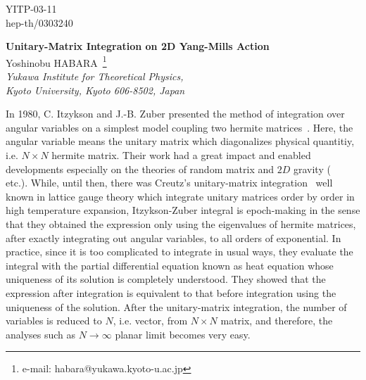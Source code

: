 \documentclass[a4paper,12pt]{article}
\begin{document}
\begin{flushright}
	YITP-03-11 \\
	hep-th/0303240
\end{flushright}

\vspace{2.5cm}

\begin{center}
{\Large\bf Unitary-Matrix Integration on 2D Yang-Mills Action}\\
\bigskip
\vspace{1.5cm}
{\large Yoshinobu H}ABARA~\footnote{e-mail: habara@yukawa.kyoto-u.ac.jp}\\
\vspace{0.5cm}
{\it  Yukawa Institute for Theoretical Physics,}\\
{\it  Kyoto University, Kyoto 606-8502, Japan}
\end{center}

\vspace{1cm}

\begin{abstract}
Using the idea of Itzykson-Zuber integral, unitary-matrix integration of 2D Yang-Mills action is presented. The uniqueness of the solution of heat equation enables us to integrate out the unitary-matrix parts of hermite matrices and to obtain the expression of integration over vectors, also in this case. 
\end{abstract}

\vspace{2.5cm}


\vskip 0.5cm

In 1980, C. Itzykson and J.-B. Zuber presented the method of integration over angular variables on a simplest model coupling two hermite matrices~\cite{itz}. Here, the angular variable means the unitary matrix which diagonalizes physical quantitiy, i.e. $N\! \times \! N$ hermite matrix. Their work had a great impact and enabled developments especially on the theories of random matrix and $2D$ gravity (~\cite{mehta} etc.). While, until then, there was Creutz's unitary-matrix integration~\cite{creutz} well known in lattice gauge theory which integrate unitary matrices order by order in high temperature expansion, Itzykson-Zuber integral is epoch-making in the sense that they obtained the expression only using the eigenvalues of hermite matrices, after exactly integrating out angular variables, to all orders of exponential. In practice, since it is too complicated to integrate in usual ways, they evaluate the integral with the partial differential equation known as heat equation whose uniqueness of its solution is completely understood. They showed that the expression after integration is equivalent to that before integration using the uniqueness of the solution. After the unitary-matrix integration, the number of variables is reduced to $N$, i.e. vector, from $N\! \times \! N$ matrix, and therefore, the analyses such as $N\! \to \! \infty$ planar limit becomes very easy.
\end{document}

